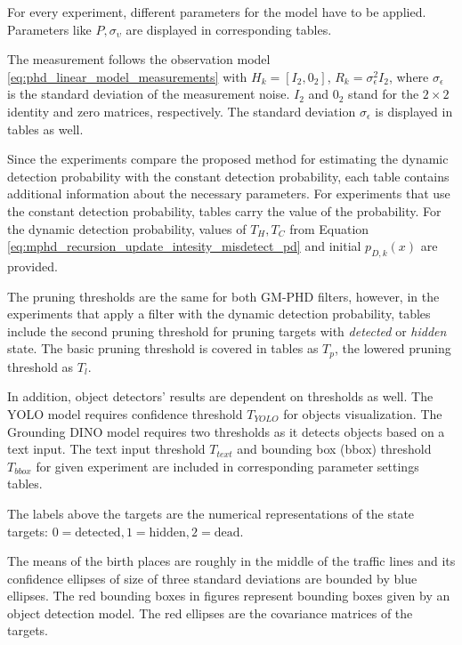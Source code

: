 For every experiment, different parameters for the model have to be applied. Parameters like $P, \sigma_{\upsilon}$
are displayed in corresponding tables.

The measurement follows the observation model \eqref{eq:phd_linear_model_measurements} with $H_k = [I_2, 0_2]$, $R_k
= \sigma_{\epsilon}^2I_2$, where $ \sigma_{\epsilon}$ is the standard deviation of the measurement noise.  $I_2$ and $0_2$ stand for
the $2\times 2$ identity and zero matrices, respectively.
The standard deviation $\sigma_{\epsilon}$ is displayed in tables as well.

Since the experiments compare the proposed method for estimating the dynamic detection probability with the constant
detection probability, each table contains additional information about the necessary parameters. For experiments that
use the constant
detection probability, tables carry the value of the probability. For the dynamic detection probability, values of $T_H, T_C$
from Equation \eqref{eq:mphd_recursion_update_intesity_misdetect_pd}
and initial $p_{D,k}(x)$ are provided.

The pruning thresholds are the same for both GM-PHD filters, however, in the experiments that apply a filter with the
dynamic detection probability, tables
include the second pruning threshold for pruning targets with \textit{detected} or \textit{hidden} state. The basic
pruning threshold is covered in tables as $T_p$, the lowered pruning threshold as $T_l$.

In addition, object detectors' results are dependent on thresholds as well. The YOLO model requires confidence
threshold $T_{YOLO}$ for objects visualization. The Grounding DINO model requires two thresholds as it detects objects based on a text input. The text input threshold $T_{text}$ and bounding box (bbox) threshold $T_{bbox}$ for given experiment are included in corresponding parameter settings tables.

The labels above
the targets are the numerical representations of the state targets: $0=\text{detected}, 1=\text{hidden}, 2=\text{dead}$.

The means of the birth places are roughly in the middle of the traffic lines and its confidence ellipses of size of
three standard
deviations are bounded by blue ellipses. The red bounding boxes in figures represent bounding
boxes given by an object detection model. The red ellipses are the covariance matrices of the targets.
















